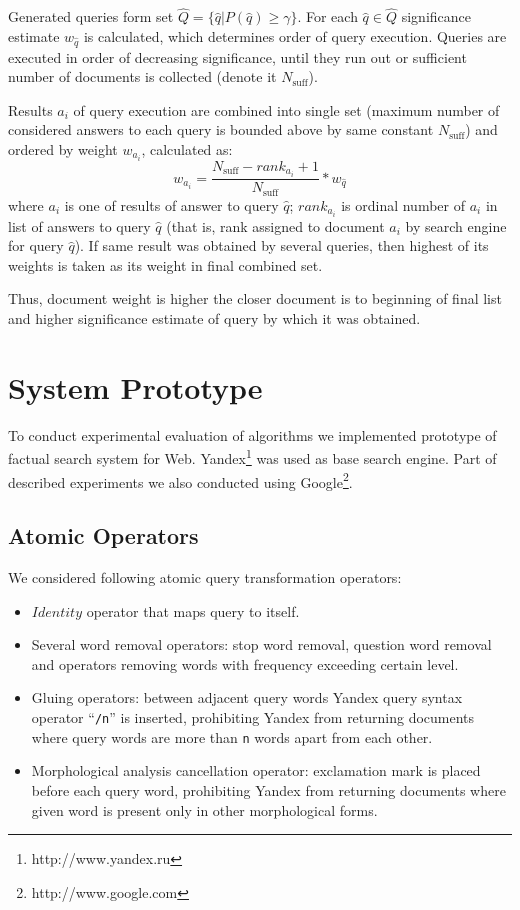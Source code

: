 \documentclass{article}
\begin{document}
Generated queries form set $\hat{Q}=\{\hat{q} | P(\hat{q})\geq\gamma\}$.
For each $\hat{q} \in \hat{Q}$ significance estimate $w_{\hat{q}}$ is calculated,
which determines order of query execution.
Queries are executed in order of decreasing significance, until they
run out or sufficient number of documents is collected (denote it $N_{\text{suff}}$).

Results $a_i$ of query execution
are combined into single set
(maximum number of considered answers to
each query is bounded above by same constant $N_{\text{suff}}$)
and ordered by weight $w_{a_i}$, calculated as:
\[
w_{a_i} = \frac{N_{\text{suff}}-\mathit{rank}_{a_{i}}+1}{N_{\text{suff}}} * w_{\hat{q}}
\]
where $a_{i}$ is one of results of answer to query $\hat{q}$;
$rank_{a_i}$ is ordinal number of $a_i$ in list of answers to query $\hat{q}$
(that is, rank assigned to document $a_i$ by search engine for query $\hat{q}$).
If same result was obtained by several queries,
then highest of its weights is taken as its weight in final combined set.

Thus, document weight is higher the closer document is to beginning of final list
and higher significance estimate of query by which it was obtained.

\section{System Prototype}

To conduct experimental evaluation of algorithms we implemented prototype
of factual search system for Web.
Yandex\footnote{http://www.yandex.ru} was used as base search engine.
Part of described experiments we also conducted
using Google\footnote{http://www.google.com}.

\subsection{Atomic Operators}

We considered following atomic query
transformation operators:

\begin{itemize}
\item $Identity$ operator that maps query to itself.
\item Several word removal operators: stop word removal, question word removal
and operators removing words with frequency exceeding certain level.
\item Gluing operators: between adjacent query words Yandex query syntax operator
``{\tt /n}'' is inserted,
prohibiting Yandex from returning documents where query words are
more than {\tt n} words apart from each other.
\item Morphological analysis cancellation operator: exclamation mark is placed before each query word,
prohibiting Yandex from returning documents where
given word is present only in other morphological forms.
\end{itemize}
\end{document}
